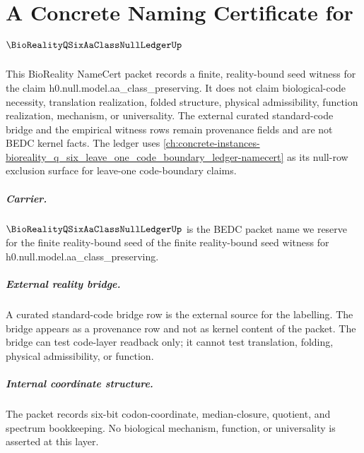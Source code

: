 \chapter{A Concrete Naming Certificate for $\BioRealityQSixAaClassNullLedgerUp$}
\label{ch:concrete-instances-bioreality_q_six_aa_class_null_ledger-namecert}

This BioReality NameCert packet records a finite, reality-bound seed
witness for the claim h0.null.model.aa\_class\_preserving. It does not claim biological-code
necessity, translation realization, folded structure, physical
admissibility, function realization, mechanism, or universality. The
external curated standard-code bridge and the empirical witness rows
remain provenance fields and are not BEDC kernel facts.
The ledger uses
\autoref{ch:concrete-instances-bioreality_q_six_leave_one_code_boundary_ledger-namecert}
as its null-row exclusion surface for leave-one code-boundary claims.

\paragraph{Carrier.} $\BioRealityQSixAaClassNullLedgerUp$ is the BEDC packet name we
reserve for the finite reality-bound seed of the finite reality-bound seed witness for h0.null.model.aa\_class\_preserving.

\paragraph{External reality bridge.} A curated standard-code bridge
row is the external source for the labelling. The bridge appears as a
provenance row and not as kernel content of the packet. The bridge can
test code-layer readback only; it cannot test translation, folding,
physical admissibility, or function.

\paragraph{Internal coordinate structure.} The packet records six-bit
codon-coordinate, median-closure, quotient, and spectrum bookkeeping.
No biological mechanism, function, or universality is asserted at this
layer.

